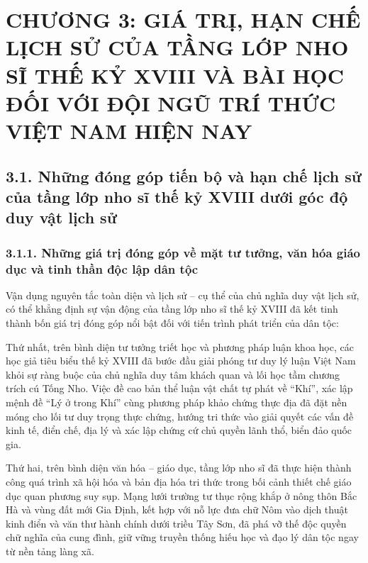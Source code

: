 \section*{CHƯƠNG 3: GIÁ TRỊ, HẠN CHẾ LỊCH SỬ CỦA TẦNG LỚP NHO SĨ THẾ KỶ XVIII VÀ BÀI HỌC ĐỐI VỚI ĐỘI NGŨ TRÍ THỨC VIỆT NAM HIỆN NAY}

\subsection*{3.1. Những đóng góp tiến bộ và hạn chế lịch sử của tầng lớp nho sĩ thế kỷ XVIII dưới góc độ duy vật lịch sử}

\subsubsection*{3.1.1. Những giá trị đóng góp về mặt tư tưởng, văn hóa giáo dục và tinh thần độc lập dân tộc}

Vận dụng nguyên tắc toàn diện và lịch sử -- cụ thể của chủ nghĩa duy vật lịch sử, có thể khẳng định sự vận động của tầng lớp nho sĩ thế kỷ XVIII đã kết tinh thành bốn giá trị đóng góp nổi bật đối với tiến trình phát triển của dân tộc:

Thứ nhất, trên bình diện tư tưởng triết học và phương pháp luận khoa học, các học giả tiêu biểu thế kỷ XVIII đã bước đầu giải phóng tư duy lý luận Việt Nam khỏi sự ràng buộc của chủ nghĩa duy tâm khách quan và lối học tầm chương trích cú Tống Nho. Việc đề cao bản thể luận vật chất tự phát về ``Khí'', xác lập mệnh đề ``Lý ở trong Khí'' cùng phương pháp khảo chứng thực địa đã đặt nền móng cho lối tư duy trọng thực chứng, hướng tri thức vào giải quyết các vấn đề kinh tế, điển chế, địa lý và xác lập chứng cứ chủ quyền lãnh thổ, biển đảo quốc gia.

Thứ hai, trên bình diện văn hóa -- giáo dục, tầng lớp nho sĩ đã thực hiện thành công quá trình xã hội hóa và bản địa hóa tri thức trong bối cảnh thiết chế giáo dục quan phương suy sụp. Mạng lưới trường tư thục rộng khắp ở nông thôn Bắc Hà và vùng đất mới Gia Định, kết hợp với nỗ lực đưa chữ Nôm vào dịch thuật kinh điển và văn thư hành chính dưới triều Tây Sơn, đã phá vỡ thế độc quyền chữ nghĩa của cung đình, giữ vững truyền thống hiếu học và đạo lý dân tộc ngay từ nền tảng làng xã.

